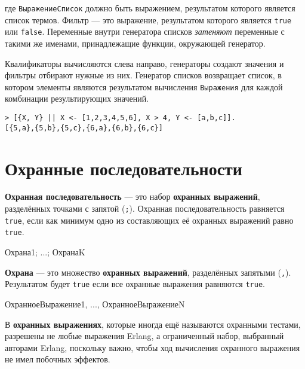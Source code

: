 где \texttt{ВыражениеСписок} должно быть выражением, результатом которого 
является список термов. Фильтр --- это выражение, результатом которого является 
\texttt{true} или \texttt{false}. Переменные внутри генератора списков 
\emph{затеняют} переменные с такими же именами, принадлежащие функции, 
окружающей генератор.

Квалификаторы вычисляются слева направо, генераторы создают значения и\linebreak
фильтры отбирают нужные из них. Генератор списков возвращает список, в котором
элементы являются результатом вычисления \texttt{Выражения} для каждой
комбинации результирующих значений.

\begin{verbatim}
> [{X, Y} || X <- [1,2,3,4,5,6], X > 4, Y <- [a,b,c]].
[{5,a},{5,b},{5,c},{6,a},{6,b},{6,c}]
\end{verbatim}


\section{Охранные последовательности}

\textbf{Охранная последовательность} --- это набор \textbf{охранных выражений},
разделённых точками с запятой (\texttt{;}). Охранная последовательность 
равняется \texttt{true}, если как минимум одно из составляющих её охранных
выражений равно \texttt{true}.

\begin{erlangru}
Охрана1; ...; ОхранаK
\end{erlangru}

\textbf{Охрана} --- это множество \textbf{охранных выражений}, разделённых 
запятыми (\texttt{,}). Результатом будет \texttt{true} если все охранные
выражения равняются \texttt{true}.

\begin{erlangru}
ОхранноеВыражение1, ..., ОхранноеВыражениеN
\end{erlangru}

В \textbf{охранных выражениях}, которые иногда ещё называются охранными тестами,
разрешены не любые выражения Erlang, а ограниченный набор, выбранный авторами 
Erlang, поскольку важно, чтобы ход вычисления охранного выражения не имел 
побочных эффектов.

